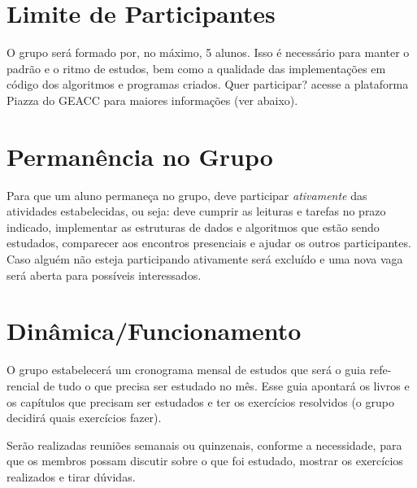 \documentclass[a4paper]{inzane_syllabus} %
\begin{document}
\vspace{0.5cm}
\section{Limite de Participantes}

O grupo será formado por, no máximo, 5 alunos. Isso é necessário para manter o
padrão e o ritmo de estudos, bem como a qualidade das implementações em código
dos algoritmos e programas criados. Quer participar? acesse a plataforma Piazza
do GEACC para maiores informações (ver abaixo).


\vspace{0.5cm}
\section{Permanência no Grupo}

Para que um aluno permaneça no grupo, deve participar \emph{ativamente} das
atividades estabelecidas, ou seja: deve cumprir as leituras e tarefas no prazo
indicado, implementar as estruturas de dados e algoritmos que estão sendo
estudados, comparecer aos encontros presenciais e ajudar os outros participantes.
Caso alguém não esteja participando ativamente será excluído e uma nova vaga
será aberta para possíveis interessados.


\vspace{0.5cm}
\section{Dinâmica/Funcionamento}

O grupo estabelecerá um cronograma mensal de estudos que será o guia refe-rencial
de tudo o que precisa ser estudado no mês. Esse guia apontará os livros e os
capítulos que precisam ser estudados e ter os exercícios resolvidos (o grupo
decidirá quais exercícios fazer).

Serão realizadas reuniões semanais ou quinzenais, conforme a necessidade, para
que os membros possam discutir sobre o que foi estudado, mostrar os exercícios
realizados e tirar dúvidas.
\end{document}
